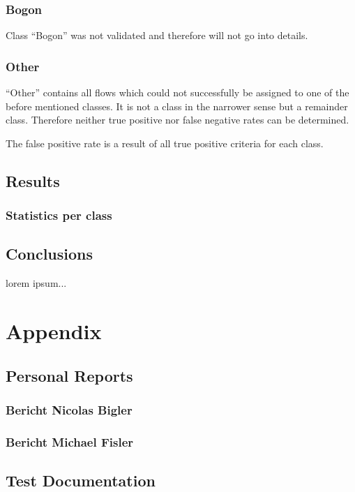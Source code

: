 \documentclass[a4paper]{scrartcl}
\begin{document}
\subsubsection{Bogon}
Class ``Bogon'' was not validated and therefore will not go into details.

\subsubsection{Other}
``Other'' contains all flows which could not successfully be assigned to one of the before mentioned classes. It is not a class in the narrower sense but a remainder class. Therefore neither true positive nor false negative rates can be determined.

The false positive rate is a result of all true positive criteria for each class.


\subsection{Results}
\subsubsection{Statistics per class}
\subsubsection{}
\subsection{Conclusions}

lorem ipsum...

\section{Appendix}
\subsection{Personal Reports}
\subsubsection{Bericht Nicolas Bigler}
\subsubsection{Bericht Michael Fisler}
\subsection{Test Documentation}
\end{document}
